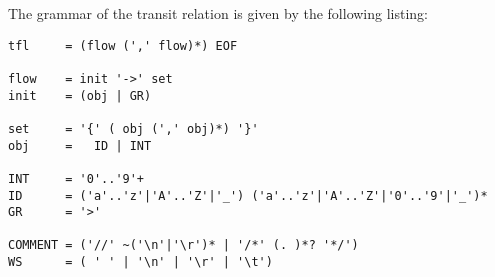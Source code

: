 \documentclass[12pt,twoside,a4paper,openright]{memoir}
\begin{document}
%
The grammar of the transit relation is given by the following listing:
\begin{lstlisting}[captionpos=b, caption=Grammar of the transit relation of Petri nets with transits., label = lst:grammar,language=ebnf]
tfl		= (flow (',' flow)*) EOF

flow  	= init '->' set
init  	= (obj | GR)

set		= '{' ( obj (',' obj)*) '}'
obj		=	ID | INT

INT 	= '0'..'9'+
ID  	= ('a'..'z'|'A'..'Z'|'_') ('a'..'z'|'A'..'Z'|'0'..'9'|'_')*
GR  	= '>'

COMMENT	= ('//' ~('\n'|'\r')* | '/*' (. )*? '*/')
WS		= ( ' ' | '\n' | '\r' | '\t')
\end{lstlisting}
\end{document}
